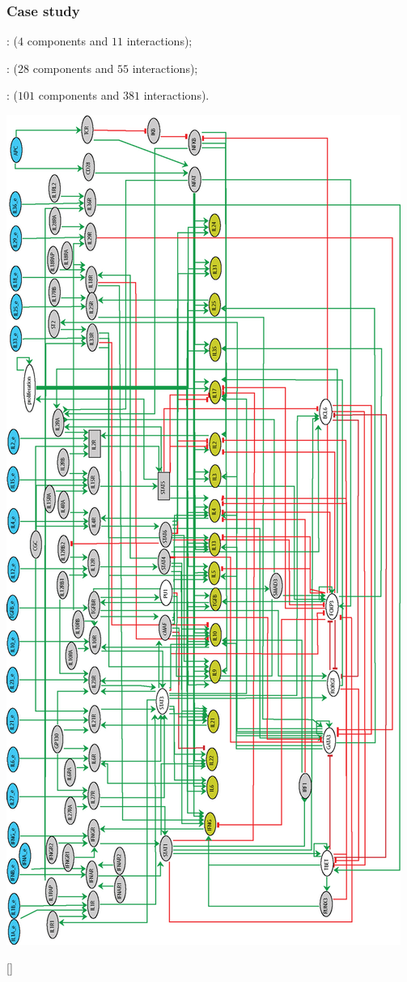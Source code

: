 \begin{frame}[c]
 \frametitle{Case study}
 

 : ($4$  components and $11$  interactions); 

 : ($28$  components and $55$  interactions); 

: ($101$  components and $381$  interactions).

\begin{center}
  \includegraphics[scale=0.18,angle=-90]{images/th_differentiation.jpg}
\end{center}
\begin{center}
 {\tiny \color{darkgreen} [\citeatfb]}
\end{center}
\end{frame}



